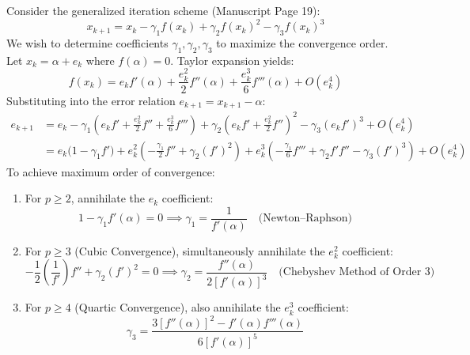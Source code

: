 \begin{theorembox}
Consider the generalized iteration scheme (Manuscript Page 19):
\begin{equation}
    x_{k+1} = x_k - \gamma_1 f(x_k) + \gamma_2 f(x_k)^2 - \gamma_3 f(x_k)^3
\end{equation}
We wish to determine coefficients $\gamma_1, \gamma_2, \gamma_3$ to maximize the convergence order.
Let $x_k = \alpha + e_k$ where $f(\alpha) = 0$. Taylor expansion yields:
\begin{equation}
    f(x_k) = e_k f'(\alpha) + \frac{e_k^2}{2} f''(\alpha) + \frac{e_k^3}{6} f'''(\alpha) + O(e_k^4)
\end{equation}
Substituting into the error relation $e_{k+1} = x_{k+1} - \alpha$:
\begin{align}
    e_{k+1} &= e_k - \gamma_1 \left( e_k f' + \frac{e_k^2}{2} f'' + \frac{e_k^3}{6} f''' \right) + \gamma_2 \left( e_k f' + \frac{e_k^2}{2} f'' \right)^2 - \gamma_3 (e_k f')^3 + O(e_k^4) \nonumber \\
    &= e_k \big( 1 - \gamma_1 f' \big) + e_k^2 \left( -\frac{\gamma_1}{2} f'' + \gamma_2 (f')^2 \right) + e_k^3 \left( -\frac{\gamma_1}{6} f''' + \gamma_2 f' f'' - \gamma_3 (f')^3 \right) + O(e_k^4)
\end{align}
To achieve maximum order of convergence:
\begin{enumerate}
    \item For $p \ge 2$, annihilate the $e_k$ coefficient:
    \begin{equation}
        1 - \gamma_1 f'(\alpha) = 0 \implies \boxed{\gamma_1 = \frac{1}{f'(\alpha)}} \quad \text{(Newton--Raphson)}
    \end{equation}
    \item For $p \ge 3$ (Cubic Convergence), simultaneously annihilate the $e_k^2$ coefficient:
    \begin{equation}
        -\frac{1}{2}\left(\frac{1}{f'}\right) f'' + \gamma_2 (f')^2 = 0 \implies \boxed{\gamma_2 = \frac{f''(\alpha)}{2 [f'(\alpha)]^3}} \quad \text{(Chebyshev Method of Order 3)}
    \end{equation}
    \item For $p \ge 4$ (Quartic Convergence), also annihilate the $e_k^3$ coefficient:
    \begin{equation}
        \boxed{\gamma_3 = \frac{3[f''(\alpha)]^2 - f'(\alpha)f'''(\alpha)}{6 [f'(\alpha)]^5}}
    \end{equation}
\end{enumerate}
\end{theorembox}

